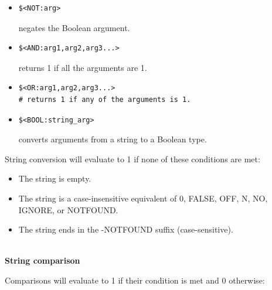 \begin{itemize}
\item 
\begin{lstlisting}[style=styleCMake]
$<NOT:arg> 
\end{lstlisting}

negates the Boolean argument.

\item 
\begin{lstlisting}[style=styleCMake]
$<AND:arg1,arg2,arg3...> 
\end{lstlisting}

returns 1 if all the arguments are 1.

\item 
\begin{lstlisting}[style=styleCMake]
$<OR:arg1,arg2,arg3...> 
# returns 1 if any of the arguments is 1.
\end{lstlisting}

\item 
\begin{lstlisting}[style=styleCMake]
$<BOOL:string_arg> 
\end{lstlisting}

converts arguments from a string to a Boolean type.
\end{itemize}

String conversion will evaluate to 1 if none of these conditions are met:

\begin{itemize}
\item 
The string is empty.

\item 
The string is a case-insensitive equivalent of 0, FALSE, OFF, N, NO, IGNORE, or NOTFOUND.

\item 
The string ends in the -NOTFOUND suffix (case-sensitive).
\end{itemize}

\hspace*{\fill} \\ %
\noindent
\textbf{String comparison}

Comparisons will evaluate to 1 if their condition is met and 0 otherwise:


